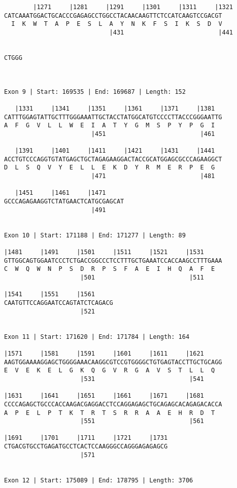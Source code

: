 \documentclass{article}
\begin{document}
\begin{Verbatim}
        |1271     |1281     |1291     |1301     |1311     |1321
CATCAAATGGACTGCACCCGAGAGCCTGGCCTACAACAAGTTCTCCATCAAGTCCGACGT
  I  K  W  T  A  P  E  S  L  A  Y  N  K  F  S  I  K  S  D  V
                             |431                          |441
  
     
CTGGG
     
  
 
Exon 9 | Start: 169535 | End: 169687 | Length: 152
 
   |1331     |1341     |1351     |1361     |1371     |1381  
CATTTGGAGTATTGCTTTGGGAAATTGCTACCTATGGCATGTCCCCTTACCCGGGAATTG
A  F  G  V  L  L  W  E  I  A  T  Y  G  M  S  P  Y  P  G  I  
                        |451                          |461  
  
   |1391     |1401     |1411     |1421     |1431     |1441  
ACCTGTCCCAGGTGTATGAGCTGCTAGAGAAGGACTACCGCATGGAGCGCCCAGAAGGCT
D  L  S  Q  V  Y  E  L  L  E  K  D  Y  R  M  E  R  P  E  G  
                        |471                          |481  
  
   |1451     |1461     |1471     
GCCCAGAGAAGGTCTATGAACTCATGCGAGCAT
                        |491     
  
 
Exon 10 | Start: 171188 | End: 171277 | Length: 89
 
|1481     |1491     |1501     |1511     |1521     |1531     
GTTGGCAGTGGAATCCCTCTGACCGGCCCTCCTTTGCTGAAATCCACCAAGCCTTTGAAA
C  W  Q  W  N  P  S  D  R  P  S  F  A  E  I  H  Q  A  F  E  
                     |501                          |511     
  
|1541     |1551     |1561     
CAATGTTCCAGGAATCCAGTATCTCAGACG
                     |521     
  
 
Exon 11 | Start: 171620 | End: 171784 | Length: 164
 
|1571     |1581     |1591     |1601     |1611     |1621     
AAGTGGAAAAGGAGCTGGGGAAACAAGGCGTCCGTGGGGCTGTGAGTACCTTGCTGCAGG
E  V  E  K  E  L  G  K  Q  G  V  R  G  A  V  S  T  L  L  Q  
                     |531                          |541     
  
|1631     |1641     |1651     |1661     |1671     |1681     
CCCCAGAGCTGCCCACCAAGACGAGGACCTCCAGGAGAGCTGCAGAGCACAGAGACACCA
A  P  E  L  P  T  K  T  R  T  S  R  R  A  A  E  H  R  D  T  
                     |551                          |561     
  
|1691     |1701     |1711     |1721     |1731
CTGACGTGCCTGAGATGCCTCACTCCAAGGGCCAGGGAGAGAGCG
                     |571                    
  
 
Exon 12 | Start: 175089 | End: 178795 | Length: 3706
 

\end{Verbatim}
\end{document}
